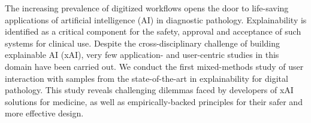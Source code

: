 The increasing prevalence of digitized workflows opens the door to life-saving applications of artificial intelligence (AI) in diagnostic pathology. Explainability is identified as a critical component for the safety, approval and acceptance of such systems for clinical use. Despite the cross-disciplinary challenge of building explainable AI (xAI), very few application- and user-centric studies in this domain have been carried out. We conduct the first mixed-methods study of user interaction with samples from the state-of-the-art in explainability for digital pathology. This study reveals challenging dilemmas faced by developers of xAI solutions for medicine, as well as empirically-backed principles for their safer and more effective design.